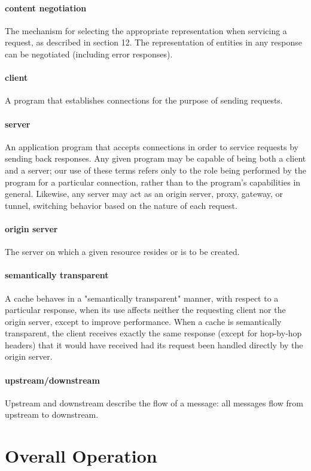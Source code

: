         \paragraph{content negotiation}
The mechanism for selecting the appropriate representation when
servicing a request, as described in section 12. The
representation of entities in any response can be negotiated
(including error responses).
        \paragraph{client}
A program that establishes connections for the purpose of sending
requests.
        \paragraph{server}
An application program that accepts connections in order to
service requests by sending back responses. Any given program may
be capable of being both a client and a server; our use of these
terms refers only to the role being performed by the program for a
particular connection, rather than to the program's capabilities
in general. Likewise, any server may act as an origin server,
proxy, gateway, or tunnel, switching behavior based on the nature
of each request.
        \paragraph{origin server}
The server on which a given resource resides or is to be created.
        \paragraph{semantically transparent}
A cache behaves in a "semantically transparent" manner, with
respect to a particular response, when its use affects neither the
requesting client nor the origin server, except to improve
performance. When a cache is semantically transparent, the client
receives exactly the same response (except for hop-by-hop headers)
that it would have received had its request been handled directly
by the origin server.
        \paragraph{upstream/downstream}
Upstream and downstream describe the flow of a message: all
messages flow from upstream to downstream.

    \section{Overall Operation}
